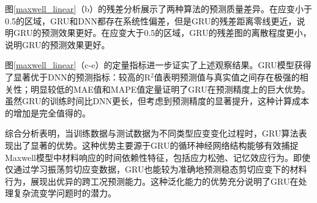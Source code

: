 图\ref{maxwell_linear}（b）的残差分析展示了两种算法的预测质量差异。在应变小于0.5的区域，GRU和DNN都存在系统性偏差，但是GRU的残差距离零线更近，说明GRU的预测效果更好。在应变大于0.5的区域，GRU的残差图的离散程度更小，说明GRU的预测效果更好。

图\ref{maxwell_linear}（c-e）的定量指标进一步证实了上述观察结果。GRU模型获得了显著优于DNN的预测指标：较高的R$^2$值表明预测值与真实值之间存在极强的相关性；明显较低的MAE值和MAPE值定量证明了GRU在预测精度上的巨大优势。虽然GRU的训练时间比DNN更长，但考虑到预测精度的显著提升，这种计算成本的增加是完全值得的。

综合分析表明，当训练数据与测试数据为不同类型应变变化过程时，GRU算法表现出了显著的优势。这种优势主要源于GRU的循环神经网络结构能够有效捕捉Maxwell模型中材料响应的时间依赖性特征，包括应力松弛、记忆效应行为。即使仅通过学习振荡剪切应变数据，GRU也能较为准确地预测稳态剪切应变下的材料行为，展现出优异的跨工况预测能力。这种泛化能力的优势充分说明了GRU在处理复杂流变学问题时的潜力。
